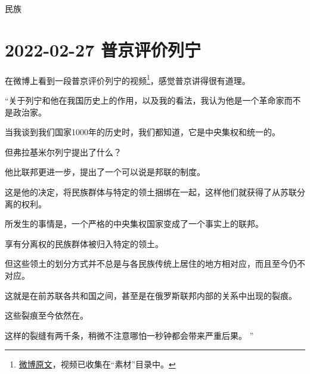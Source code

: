 \begin{taged}{民族}
\section{2022-02-27 普京评价列宁}
\end{taged}

在微博上看到一段普京评价列宁的视频\footnote{\href{https://m.weibo.cn/status/4739964812135108}{微博原文}，视频已收集在“素材”目录中。}，感觉普京讲得很有道理。

“关于列宁和他在我国历史上的作用，以及我的看法，我认为他是一个革命家而不是政治家。

当我谈到我们国家1000年的历史时，我们都知道，它是中央集权和统一的。

但弗拉基米尔列宁提出了什么？

他比联邦更进一步，提出了一个可以说是邦联的制度。

这是他的决定，将民族群体与特定的领土捆绑在一起，这样他们就获得了从苏联分离的权利。

所发生的事情是，一个严格的中央集权国家变成了一个事实上的联邦。

享有分离权的民族群体被归入特定的领土。

但这些领土的划分方式并不总是与各民族传统上居住的地方相对应，而且至今仍不对应。

这就是在前苏联各共和国之间，甚至是在俄罗斯联邦内部的关系中出现的裂痕。

这些裂痕至今依然在。

这样的裂缝有两千条，稍微不注意哪怕一秒钟都会带来严重后果。
”

